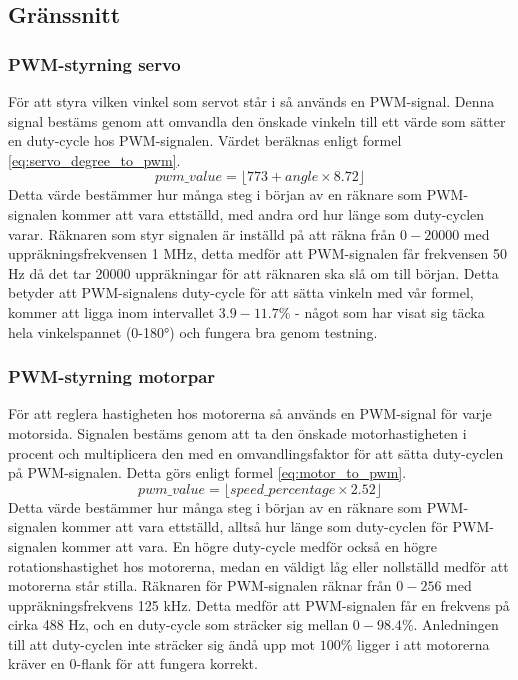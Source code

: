 \documentclass[a4paper,11pt]{article}
\begin{document}
\subsection{Gränssnitt} \label{ssec:controlInterface}

\subsubsection{PWM-styrning servo}
För att styra vilken vinkel som servot står i så används en PWM-signal. Denna signal bestäms genom att omvandla den önskade vinkeln till ett värde som sätter en duty-cycle hos PWM-signalen. Värdet beräknas enligt formel \ref{eq:servo_degree_to_pwm}.
\begin{equation}\label{eq:servo_degree_to_pwm}
pwm\_value =  \lfloor 773 + angle \times 8.72 \rfloor 
\end{equation}
Detta värde bestämmer hur många steg i början av en räknare som PWM-signalen kommer att vara ettställd, med andra ord hur länge som duty-cyclen varar. Räknaren som styr signalen är inställd på att räkna från $0-20000$ med uppräkningsfrekvensen 1 \si{\mega\hertz}, detta medför att PWM-signalen får frekvensen 50 \si{\hertz} då det tar 20000 uppräkningar för att räknaren ska slå om till början. Detta betyder att PWM-signalens duty-cycle för att sätta vinkeln med vår formel, kommer att ligga inom intervallet $3.9-11.7\%$ - något som har visat sig täcka hela vinkelspannet (0-180\si{\degree}) och fungera bra genom testning.


\subsubsection{PWM-styrning motorpar}
För att reglera hastigheten hos motorerna så används en PWM-signal för varje motorsida. Signalen bestäms genom att ta den önskade motorhastigheten i procent och multiplicera den med en omvandlingsfaktor för att sätta duty-cyclen på PWM-signalen. Detta görs enligt formel \ref{eq:motor_to_pwm}.
\begin{equation}\label{eq:motor_to_pwm}
pwm\_value =  \lfloor speed\_percentage \times 2.52 \rfloor 
\end{equation}
Detta värde bestämmer hur många steg i början av en räknare som PWM-signalen kommer att vara ettställd, alltså hur länge som duty-cyclen för PWM-signalen kommer att vara. En högre duty-cycle medför också en högre rotationshastighet hos motorerna, medan en väldigt låg eller nollställd medför att motorerna står stilla.  Räknaren för PWM-signalen räknar från $0-256$ med uppräkningsfrekvens 125 \si{\kilo\hertz}. Detta medför att PWM-signalen får en frekvens på cirka 488 \si{\hertz}, och en duty-cycle som sträcker sig mellan $0-98.4\%$. Anledningen till att duty-cyclen inte sträcker sig ändå upp mot $100\%$ ligger i att motorerna kräver en $0$-flank för att fungera korrekt.
\end{document}
